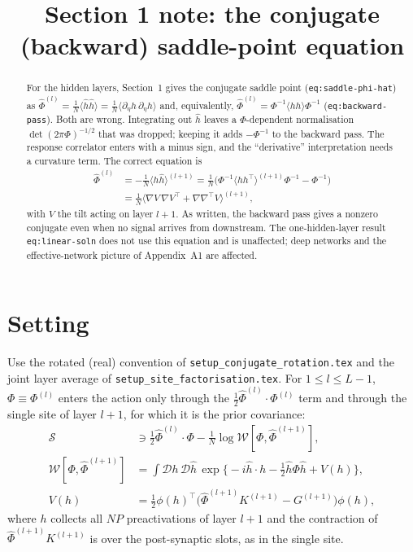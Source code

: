 \documentclass[11pt,a4paper]{article}
\title{Section 1 note: the conjugate (backward) saddle-point equation}
\author{}
\date{}
\newcommand{\D}{\mathcal D}
\newcommand{\W}{\mathcal W}
\newcommand{\Sact}{\mathcal S}
\begin{document}
\maketitle

\begin{abstract}
For the hidden layers, Section~1 gives the conjugate saddle point
(\texttt{eq:saddle-phi-hat}) as
$\hat\Phi^{(l)} = \frac1N\langle\hat h\hat h\rangle
= \frac1N\langle\partial_\eta h\,\partial_\eta h\rangle$
and, equivalently, $\hat\Phi^{(l)} = \Phi^{-1}\langle hh\rangle\Phi^{-1}$
(\texttt{eq:backward-pass}). Both are wrong. Integrating out $\hat h$ leaves a
$\Phi$-dependent normalisation $\det(2\pi\Phi)^{-1/2}$ that was dropped; keeping
it adds $-\Phi^{-1}$ to the backward pass. The response correlator enters with a
minus sign, and the ``derivative'' interpretation needs a curvature term. The
correct equation is
\begin{align*}
  \hat\Phi^{(l)} &= -\frac1N\langle\hat h\hat h\rangle^{(l+1)}
  = \frac1N\Big(\Phi^{-1}\langle h h^\top\rangle^{(l+1)}\Phi^{-1} - \Phi^{-1}\Big)\\
  &= \frac1N\big\langle\nabla V\,\nabla V^\top + \nabla\nabla^\top V\big\rangle^{(l+1)},
\end{align*}
with $V$ the tilt acting on layer $l+1$. As written, the backward pass gives a
nonzero conjugate even when no signal arrives from downstream. The one-hidden-layer
result \texttt{eq:linear-soln} does not use this equation and is unaffected;
deep networks and the effective-network picture of Appendix~A1 are affected.
\end{abstract}

\section{Setting}

Use the rotated (real) convention of \texttt{setup\_conjugate\_rotation.tex}
and the joint layer average of \texttt{setup\_site\_factorisation.tex}. For
$1\le l\le L-1$, $\Phi\equiv\Phi^{(l)}$ enters the action only through the
$\frac12\hat\Phi^{(l)}\cdot\Phi^{(l)}$ term and through the single site of layer
$l+1$, for which it is the prior covariance:
\begin{align}
  \Sact &\ni \tfrac12\hat\Phi^{(l)}\cdot\Phi - \tfrac1N\log\W[\Phi,\hat\Phi^{(l+1)}],\\
  \W[\Phi,\hat\Phi^{(l+1)}]
  &= \int\D h\,\D\hat h\,\exp\Big\{-i\hat h\cdot h - \tfrac12\hat h\Phi\hat h + V(h)\Big\},
  \label{eq:W-msr}\\
  V(h) &= \tfrac12\phi(h)^\top\big(\hat\Phi^{(l+1)}K^{(l+1)} - G^{(l+1)}\big)\phi(h),
\end{align}
where $h$ collects all $NP$ preactivations of layer $l+1$ and the contraction of
$\hat\Phi^{(l+1)}K^{(l+1)}$ is over the post-synaptic slots, as in the single site.
\end{document}
